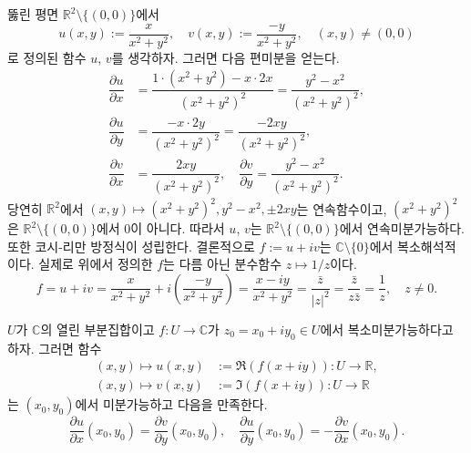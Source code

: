 \begin{saltexample}[label=example-2-6]{}{}
뚫린 평면 $\mathbb R^2 \setminus \{(0,0)\}$에서 
\[
u(x,y) := \dfrac{x}{x^2+y^2}, \quad
v(x,y) := \dfrac{-y}{x^2+y^2}, \quad (x,y)\ne(0,0)
\]
로 정의된 함수 
$u$, $v$를 생각하자.
그러면 다음 편미분을 얻는다.
\begin{align*}
\dfrac{\partial u}{\partial x} &= \dfrac{1\cdot(x^2+y^2)-x\cdot 2x}{(x^2+y^2)^2}
= \dfrac{y^2-x^2}{(x^2+y^2)^2}, \\
\dfrac{\partial u}{\partial y} &= \dfrac{-x\cdot 2y}{(x^2+y^2)^2}
= \dfrac{-2xy}{(x^2+y^2)^2}, \\
\dfrac{\partial v}{\partial x} &= \dfrac{2xy}{(x^2+y^2)^2}, \quad
\dfrac{\partial v}{\partial y} = \dfrac{y^2-x^2}{(x^2+y^2)^2}.
\end{align*}
당연히 $\mathbb R^2$에서 $(x,y) \mapsto (x^2+y^2)^2, y^2-x^2, \pm 2xy$는 
연속함수이고, $(x^2+y^2)^2$은 $\mathbb R^2 \setminus \{(0,0)\}$에서 
$0$이 아니다.
따라서 $u$, $v$는 $\mathbb R^2 \setminus \{(0,0)\}$에서 
연속미분가능하다.
또한 코시-리만 방정식이 성립한다. 
결론적으로 $f:=u+iv$는 $\mathbb C\setminus\{0\}$에서 
복소해석적이다.
실제로 위에서 정의한 $f$는 다름 아닌 분수함수 $z\mapsto 1/z$이다.
\[
f=u+iv= \dfrac x{x^2+y^2}+i\left(\dfrac{-y}{x^2+y^2}\right)
= \dfrac{x-iy}{x^2+y^2} = \dfrac{\bar z}{|z|^2} = \dfrac{\bar z}{z \bar z}
= \dfrac  1z, \quad z\ne 0.
\]
\end{saltexample}


\par\smallskip

\par\smallskip

\begin{salttheorem}{}{} \label{thm-2-1}
$U$가 $\mathbb C$의 열린 부분집합이고
$f:U\to \mathbb C$가 $z_0=x_0+iy_0\in U$에서 복소미분가능하다고 하자.
그러면 함수
\begin{align*}
(x,y) \mapsto u(x,y) & := \Re(f(x+iy)): U\to \mathbb R, \\
(x,y) \mapsto v(x,y) & := \Im(f(x+iy)): U\to \mathbb R
\end{align*}
는 $(x_0, y_0)$에서 미분가능하고 다음을 만족한다.
\begin{equation} \label{eq-2-3}
\dfrac{\partial u}{\partial x}(x_0,y_0) = \dfrac{\partial v}{\partial y}(x_0,y_0),
\quad
\dfrac{\partial u}{\partial y}(x_0,y_0) = - \dfrac{\partial v}{\partial x}(x_0,y_0).
\end{equation}
\end{salttheorem}

